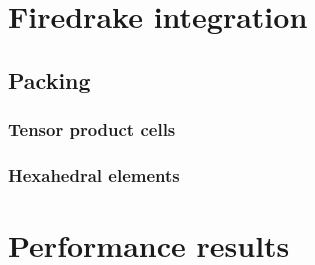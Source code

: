 \documentclass[thesis]{subfiles}
\begin{document}


\chapter{Firedrake integration}




\section{Packing}
\subsection{Tensor product cells}
\subsection{Hexahedral elements}



\chapter{Performance results}


\end{document}
